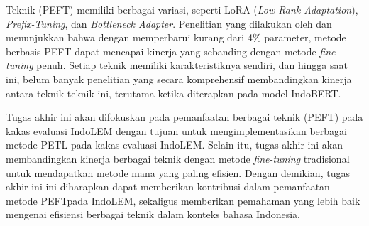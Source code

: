 Teknik \PEFT (PEFT) memiliki berbagai variasi, seperti LoRA (\textit{Low-Rank Adaptation}), \textit{Prefix-Tuning}, dan \textit{Bottleneck Adapter}. Penelitian yang dilakukan oleh \citeauthor{adapter} \parencite{adapter} dan \citeauthor{uvpl} \parencite{uvpl} menunjukkan bahwa dengan memperbarui kurang dari 4\% parameter, metode berbasis PEFT dapat mencapai kinerja yang sebanding dengan metode \textit{fine-tuning} penuh. Setiap teknik memiliki karakteristiknya sendiri, dan hingga saat ini, belum banyak penelitian yang secara komprehensif membandingkan kinerja antara teknik-teknik ini, terutama ketika diterapkan pada model IndoBERT. 

Tugas akhir ini akan difokuskan pada pemanfaatan berbagai teknik \PEFT (PEFT) pada kakas evaluasi IndoLEM dengan tujuan untuk mengimplementasikan berbagai metode PETL pada kakas evaluasi IndoLEM. Selain itu, tugas akhir ini akan membandingkan kinerja berbagai teknik \PEFT dengan metode \textit{fine-tuning} tradisional untuk mendapatkan metode mana yang paling efisien. Dengan demikian, tugas akhir ini ini diharapkan dapat memberikan kontribusi dalam pemanfaatan metode PEFTpada IndoLEM, sekaligus memberikan pemahaman yang lebih baik mengenai efisiensi berbagai teknik \PEFT dalam konteks bahasa Indonesia.
